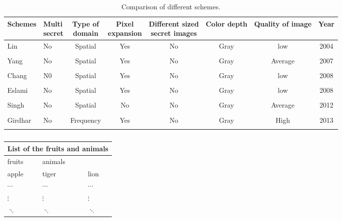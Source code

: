 \documentclass[12pt]{article}
\begin{document}
\begin{table}
\caption{Comparison of different schemes.}
\begin{adjustbox}{angle=45}
\begin{tabular}{|l||l||c||c||c||c||c||c}
\toprule
Schemes & \makecell{Multi\\secret} & \makecell{Type of\\domain} & \makecell{Pixel\\expansion} & \makecell{Different sized\\secret images} & Color depth  &  Quality of image  & Year \\ [1.5ex] \cline{2-5}
\midrule
Lin  &  No  &  Spatial & Yes & No & Gray &  low  & 2004\\ \\
Yang &  No  &  Spatial & Yes & No & Gray & Average & 2007  \\ \\
Chang & N0 & Spatial  & Yes & No & Gray & low & 2008 \\ \\
Eslami & No & Spatial & Yes & No & Gray & low & 2008\\ \\
Singh  & No & Spatial & No  & No & Gray & Average & 2012\\ \\
Girdhar & No & Frequency & Yes & No & Gray & High & 2013 \\ \\
\bottomrule
\end{tabular}
\end{adjustbox}
\end{table}

\newpage
\begin{table}
\caption{}
\centering
\begin{tabular}{|l||l||l|}
\hline
\multicolumn{3}{|c|}{List of the fruits and animals}\\ \hline
fruits  &  animals    \\ \hline
apple  &  tiger  &  lion \\ 
$\cdots$  &  $\cdots$  &  $\cdots$ \\ \hline
$\vdots$  &  $\vdots$  &  $\vdots$ \\ \hline
$\ddots$  &  $\ddots$  &  $\ddots$ \\ \hline \hline
\end{tabular}
\end{table}
\end{document}
